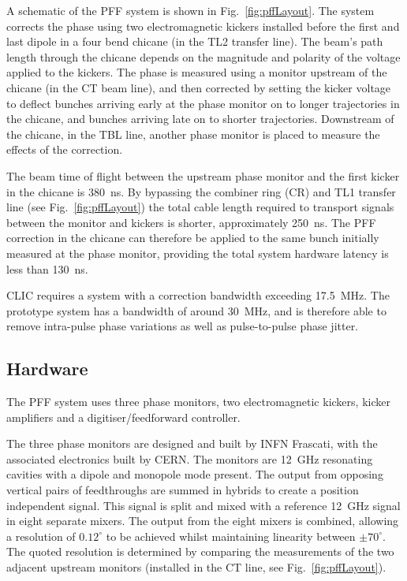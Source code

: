\documentclass[%
 reprint,
 amsmath,amssymb,
 prl,
]{revtex4-1}
\begin{document}
A schematic of the PFF system is shown in Fig.~\ref{fig:pffLayout}. The system 
corrects the phase using two electromagnetic kickers installed 
before the first and last dipole in a four bend chicane (in the TL2 transfer 
line). The beam's path length 
through the chicane depends on the magnitude and polarity of the voltage 
applied to the kickers. The phase is measured using a monitor upstream of 
the chicane (in the CT beam line), and then corrected by setting the kicker 
voltage to deflect bunches arriving early at the phase monitor on to longer 
trajectories in the chicane, and bunches arriving late on to shorter 
trajectories. Downstream of the chicane, in the TBL line, another phase monitor 
is placed to measure the effects of the correction.

The beam time of flight between the upstream phase monitor and the first kicker 
in the chicane is 380~ns. By bypassing the combiner ring (CR) and TL1 transfer 
line (see Fig.~\ref{fig:pffLayout}) the total cable length required to 
transport signals between the monitor and kickers is shorter, approximately 
250~ns. The PFF correction in the chicane can therefore be applied to the same 
bunch initially measured at the phase monitor, providing the total system 
hardware latency is less than 130~ns. 

CLIC requires a system with a correction 
bandwidth exceeding 17.5~MHz. The prototype system has a bandwidth of around 
30~MHz, and is therefore able to remove intra-pulse phase variations as well as 
pulse-to-pulse phase jitter.

\subsection{\label{ss:hardware}Hardware}

The PFF system uses three phase monitors, two electromagnetic kickers, kicker 
amplifiers and a digitiser/feedforward controller.

The three phase monitors are designed and built by INFN Frascati, with the 
associated electronics built by CERN. The monitors are 12~GHz resonating 
cavities with a dipole and monopole mode present. The output from opposing 
vertical pairs of feedthroughs are summed in hybrids to create a position 
independent signal. This signal is split and mixed with a reference 12~GHz 
signal in eight separate mixers. The output from the eight mixers is combined, 
allowing a resolution of \(0.12^\circ\) to be 
achieved whilst maintaining linearity between \(\pm70^\circ\). The quoted 
resolution 
is determined by 
comparing the measurements of the two adjacent upstream monitors (installed in 
the CT 
line, see Fig.~\ref{fig:pffLayout}).
\end{document}
